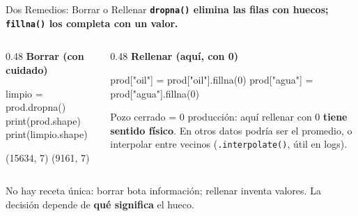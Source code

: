 \documentclass[aspectratio=169, 11pt]{beamer}
\begin{document}
\begin{frame}[fragile,shrink=15]{Dos Remedios: Borrar o Rellenar}
  \vspace{-4pt}
  {\small\color{arcaDark}\bfseries
    \texttt{dropna()} elimina las filas con huecos; \texttt{fillna()} los completa con un valor.}

  \vspace{4pt}
  \begin{columns}[T]
    \begin{column}{0.48\textwidth}
      {\scriptsize\color{arcaRed}\bfseries\faTrash\hspace{3pt}Borrar (con cuidado)}
      \begin{pyblock}
limpio = prod.dropna()
print(prod.shape)
print(limpio.shape)
      \end{pyblock}
      \vspace{2pt}
      \begin{outputblock}
(15634, 7)
(9161, 7)
      \end{outputblock}
    \end{column}

    \begin{column}{0.48\textwidth}
      {\scriptsize\color{codeGreen}\bfseries\faPlus\hspace{3pt}Rellenar (aquí, con 0)}
      \begin{pyblock}
prod["oil"] = prod["oil"].fillna(0)
prod["agua"] = prod["agua"].fillna(0)
      \end{pyblock}
      \vspace{4pt}
      {\scriptsize\color{textMuted}
        Pozo cerrado = 0 producción: aquí
        rellenar con 0 \textbf{tiene sentido físico}.
        En otros datos podría ser el promedio,
        o interpolar entre vecinos
        (\texttt{.interpolate()}, útil en logs).}
    \end{column}
  \end{columns}

  \vspace{5pt}
  {\scriptsize\color{textMuted}
    \faLightbulb[regular]\hspace{3pt}%
    No hay receta única: borrar bota información; rellenar inventa valores. La decisión depende
    de \textbf{qué significa} el hueco.}
\end{frame}
\end{document}
